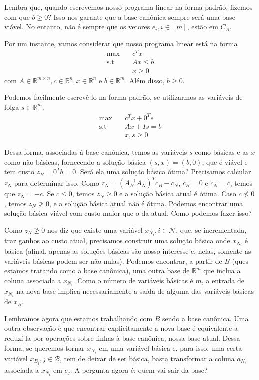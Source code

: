 \documentclass[]{article}
\numberwithin{equation}{section}
\begin{document}
Lembra que, quando escrevemos nosso programa linear na forma padrão, fizemos com que $b \geq 0$?
Isso nos garante que a base canônica sempre será uma base viável.
No entanto, não é sempre que os vetores $e_i, i \in [m]$, estão em $C_A$.

Por um instante, vamos considerar que nosso programa linear está na forma
\begin{align}
\max        &\quad  c^Tx \\
\text{s.t}  &\quad  Ax \leq b \\
            &\quad  x \geq 0
\end{align}
com $A \in \mathbb{R}^{m \times n}, c \in \mathbb{R}^n, x \in \mathbb{R}^n$ e $b \in \mathbb{R}^m$.
Além disso, $b \geq 0$.

Podemos facilmente escrevê-lo na forma padrão, se utilizarmos as variáveis de folga
$s \in \mathbb{R}^m$.
\begin{align}
\max        &\quad  c^Tx + 0^Ts \\
\text{s.t}  &\quad  Ax + Is = b \\
            &\quad  x, s \geq 0
\end{align}

Dessa forma, associadas à base canônica, temos as variáveis $s$ como básicas e as $x$ como não-básicas,
fornecendo a solução básica $(s, x) = (b, 0)$, que é viável e tem custo $z_B = 0^Tb = 0$.
Será ela uma solução básica ótima?
Precisamos calcular $z_N$ para determinar isso.
Como $z_N = (A_B^{-1}A_N)^Tc_B - c_N$, $c_B = 0$ e $c_N = c$, temos que $z_N = -c$.
Se $c \leq 0$, temos $z_N \geq 0$ e a solução básica atual é ótima.
Caso $c \not\leq 0$, temos $z_N \not\geq 0$, e a solução básica atual não é ótima.
Podemos encontrar uma solução básica viável com custo maior que o da atual.
Como podemos fazer isso?

Como $z_N \not\geq 0$ nos diz que existe uma variável $x_{N_i}, i \in \mathcal{N}$, que, se
incrementada, traz ganhos ao custo atual, precisamos construir uma solução básica onde $x_{N_i}$ é
básica (afinal, apenas as soluções básicas são nosso interesse e, nelas, somente as variáveis básicas
podem ser não-nulas).
Podemos encontrar, a partir de $B$ (ques estamos tratando como a base canônica), uma outra base de
$\mathbb{R}^m$ que inclua a coluna associada a $x_{N_i}$.
Como o número de variáveis básicas é $m$, a entrada de $x_{N_i}$ na nova base implica necessariamente
a saída de alguma das variáveis básicas de $x_B$.

Lembramos agora que estamos trabalhando com $B$ sendo a base canônica.
Uma outra observação é que encontrar explicitamente a nova base é equivalente a reduzí-la por
operações sobre linhas à base canônica, nossa base atual.
Dessa forma, se queremos tornar $x_{N_i}$ em uma variável básica e, para isso, uma certa variável
$x_{B_j}, j \in \mathcal{B}$, tem de deixar de ser básica, basta transformar a coluna $a_{N_i}$ associada a $x_{N_i}$ em
$e_j$. A pergunta agora é: quem vai sair da base?
\end{document}
